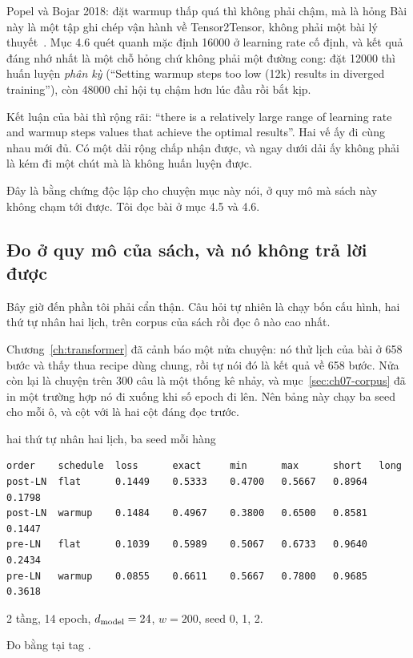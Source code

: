 \begin{bridge}{Popel và Bojar 2018: đặt warmup thấp quá thì không phải chậm, mà là hỏng}
%
Bài này là một tập ghi chép vận hành về Tensor2Tensor, không phải một bài lý
thuyết~\autocite{popel2018tips}. Mục 4.6 quét  quanh mặc
định 16000 ở learning rate cố định, và kết quả đáng nhớ nhất là một chỗ hỏng
chứ không phải một đường cong: đặt 12000 thì huấn luyện \emph{phân kỳ}
(\enquote{Setting warmup steps too low (12k) results in diverged training}),
còn 48000 chỉ hội tụ chậm hơn lúc đầu rồi bắt kịp.

Kết luận của bài thì rộng rãi: \enquote{there is a relatively large range of
learning rate and warmup steps values that achieve the optimal results}. Hai vế
ấy đi cùng nhau mới đủ. Có một dải rộng chấp nhận được, và ngay dưới dải ấy
không phải là kém đi một chút mà là không huấn luyện được.

Đây là bằng chứng độc lập cho chuyện mục này nói, ở quy mô mà sách này không
chạm tới được. Tôi đọc bài ở mục 4.5 và 4.6.
\end{bridge}

\subsection*{Đo ở quy mô của sách, và nó không trả lời được}

%
Bây giờ đến phần tôi phải cẩn thận. Câu hỏi tự nhiên là chạy bốn cấu hình, hai
thứ tự nhân hai lịch, trên corpus của sách rồi đọc ô nào cao nhất.

Chương~\ref{ch:transformer} đã cảnh báo một nửa chuyện: nó thử lịch của bài ở
658 bước và thấy thua recipe dùng chung, rồi tự nói đó là kết quả về 658 bước.
Nửa còn lại là chuyện  trên 300 câu là một
thống kê nhảy, và
mục~\ref{sec:ch07-corpus} đã in một trường hợp nó đi xuống khi số epoch đi lên.
Nên bảng này chạy ba seed cho mỗi ô, và cột  với  là hai cột
đáng đọc trước.

\begin{measured}{hai thứ tự nhân hai lịch, ba seed mỗi hàng}
\begin{verbatim}
order    schedule  loss      exact     min      max      short   long
post-LN  flat      0.1449    0.5333    0.4700   0.5667   0.8964  0.1798
post-LN  warmup    0.1484    0.4967    0.3800   0.6500   0.8581  0.1447
pre-LN   flat      0.1039    0.5989    0.5067   0.6733   0.9640  0.2434
pre-LN   warmup    0.0855    0.6611    0.5667   0.7800   0.9685  0.3618
\end{verbatim}

2 tầng, 14 epoch, \(d_{\mathrm{model}} = 24\), \(w = 200\), seed 0, 1, 2.

Đo bằng  tại tag .
\end{measured}

